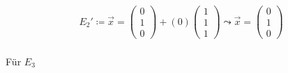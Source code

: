 \begin{gather}
E_2'\coloneqq \vec{x} = \begin{pmatrix}
0\\1\\0
\end{pmatrix}+(0) \begin{pmatrix}
1\\1\\1
\end{pmatrix} 
\leadsto \vec{x} =
\begin{pmatrix}
0\\1\\0
\end{pmatrix}
\end{gather}\\

Für \ensuremath{E_3}

